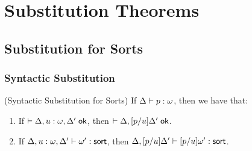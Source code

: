 \section{Substitution Theorems}

\subsection{Substitution for Sorts}

\subsubsection{Syntactic Substitution}

\begin{lemma}{(Syntactic Substitution for Sorts)}
If $\judgeA{p}{\omega}$, then we have that:

\begin{enumerate}
\item If $\judgeACtx{\Delta, u:\omega, \Delta'}$, then  
         $\judgeACtx{\Delta, [p/u]\Delta'}$. 
\item If $\judgeSort[\Delta, u:\omega, \Delta']{\omega'}$,  then
         $\judgeSort[{\Delta, [p/u]\Delta'}]{[p/u]\omega'}$. 
\end{enumerate}
\end{lemma}
